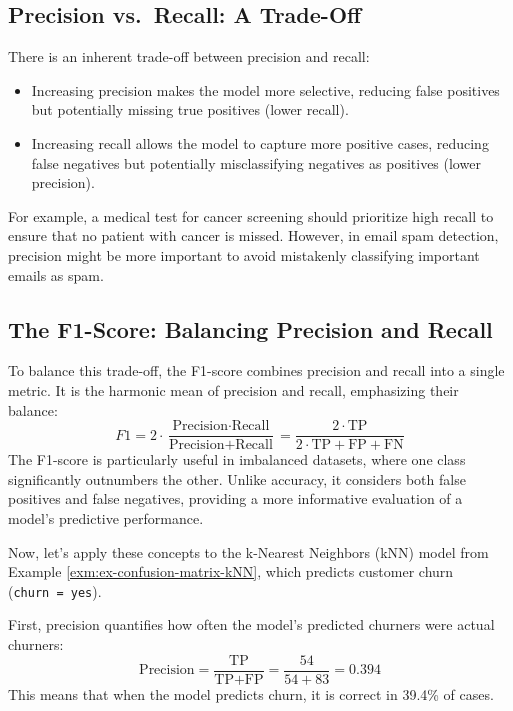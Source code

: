 \documentclass[
  11pt,
]{book}
\providecommand{\tightlist}{%
  \setlength{\itemsep}{0pt}\setlength{\parskip}{0pt}}
\theoremstyle{definition}
\theoremstyle{definition}
\theoremstyle{definition}
\theoremstyle{definition}
\theoremstyle{remark}
\begin{document}
\subsection*{Precision vs.~Recall: A Trade-Off}\label{precision-vs.-recall-a-trade-off}


There is an inherent trade-off between precision and recall:

\begin{itemize}
\tightlist
\item
  Increasing precision makes the model more selective, reducing false positives but potentially missing true positives (lower recall).\\
\item
  Increasing recall allows the model to capture more positive cases, reducing false negatives but potentially misclassifying negatives as positives (lower precision).
\end{itemize}

For example, a medical test for cancer screening should prioritize high recall to ensure that no patient with cancer is missed. However, in email spam detection, precision might be more important to avoid mistakenly classifying important emails as spam.

\subsection*{The F1-Score: Balancing Precision and Recall}\label{the-f1-score-balancing-precision-and-recall}


To balance this trade-off, the F1-score combines precision and recall into a single metric. It is the harmonic mean of precision and recall, emphasizing their balance:
\[
F1 = 2 \cdot \frac{\text{Precision} \cdot \text{Recall}}{\text{Precision} + \text{Recall}}
   = \frac{2 \cdot \text{TP}}{2 \cdot \text{TP} + \text{FP} + \text{FN}}
\]
The F1-score is particularly useful in imbalanced datasets, where one class significantly outnumbers the other. Unlike accuracy, it considers both false positives and false negatives, providing a more informative evaluation of a model's predictive performance.

Now, let's apply these concepts to the k-Nearest Neighbors (kNN) model from Example \ref{exm:ex-confusion-matrix-kNN}, which predicts customer churn (\texttt{churn\ =\ yes}).

First, precision quantifies how often the model's predicted churners were actual churners:\\
\[
\text{Precision} = \frac{\text{TP}}{\text{TP} + \text{FP}} = \frac{54}{54 + 83} = 0.394
\]
This means that when the model predicts churn, it is correct in 39.4\% of cases.
\end{document}
